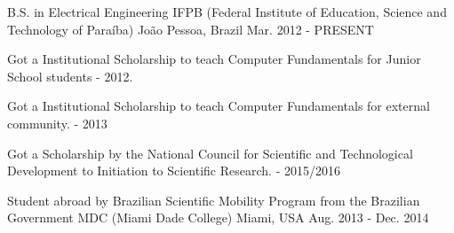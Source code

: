 

\begin{cventries}

  \cventry
    {B.S. in Electrical Engineering} %
    {IFPB (Federal Institute of Education, Science and Technology of Paraíba)} %
    {João Pessoa, Brazil} %
    {Mar. 2012 - PRESENT} %
    {
      \begin{cvitems} %
        \item {Got a Institutional Scholarship to teach Computer Fundamentals for Junior School students - 2012.}
        \item {Got a Institutional Scholarship to teach Computer Fundamentals for external community. - 2013}
        \item {Got a Scholarship by the National Council for Scientific and Technological Development to Initiation to Scientific Research. - 2015/2016}
      \end{cvitems}
    }
    
    \cventry
    {Student abroad by Brazilian Scientific Mobility Program from the Brazilian Government} %
    {MDC (Miami Dade College)} %
    {Miami, USA} %
    {Aug. 2013 - Dec. 2014} %
    {
    }

\end{cventries}
